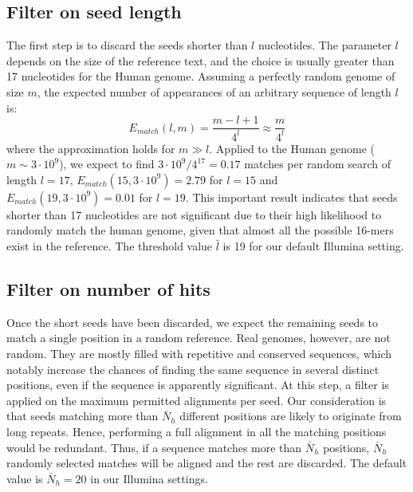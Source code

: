 \subsection{Filter on seed length}
The first step is to discard the seeds shorter than $l$
nucleotides. The parameter $l$ depends on the size of the reference
text, and the choice is usually greater than 17 nucleotides for the
Human genome. Assuming a perfectly random genome of size $m$, the
expected number of appearances of an arbitrary sequence of length $l$
is:
\begin{equation}
  E_{match}(l,m) = \frac{m-l+1}{4^l} \approx \frac{m}{4^l}
\end{equation}
where the approximation holds for $m \gg l$. Applied to the Human
genome ($m\sim3\cdot10^9$), we expect to find $3\cdot10^9/4^{17} =
0.17$ matches per random search of length $l=17$,
$E_{match}(15,3\cdot10^9) = 2.79$ for $l=15$ and
$E_{match}(19,3\cdot10^9) = 0.01$ for $l=19$. This important result
indicates that seeds shorter than 17 nucleotides are not significant
due to their high likelihood to randomly match the human genome,
given that almost all the possible 16-mers exist in the reference. The
threshold value $\bar{l}$ is 19 for our default Illumina setting.

\subsection{Filter on number of hits}
Once the short seeds have been discarded, we expect the remaining
seeds to match a single position in a random reference. Real genomes,
however, are not random. They are mostly filled with repetitive and
conserved sequences, which notably increase the chances of finding the
same sequence in several distinct positions, even if the sequence is
apparently significant. At this step, a filter is applied on the
maximum permitted alignments per seed. Our consideration is that
seeds matching more than $\bar{N}_h$ different positions are likely to
originate from long repeats. Hence, performing a full alignment in all
the matching positions would be redundant. Thus, if a sequence
matches more than $\bar{N}_h$ positions, $\bar{N}_h$ randomly selected
matches will be aligned and the rest are discarded. The default value
is $\bar{N}_h=20$ in our Illumina settings.

